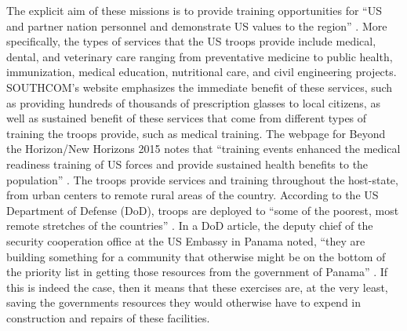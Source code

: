 \documentclass[12pt]{article}
\begin{document}
\begin{doublespace}
The explicit aim of these missions is to provide training opportunities for ``US and partner nation personnel and demonstrate US values to the region'' \cite{SouthcomStatePartner}. More specifically, the types of services that the US troops provide include medical, dental, and veterinary care ranging from preventative medicine to public health, immunization, medical education, nutritional care, and civil engineering projects. SOUTHCOM's website emphasizes the immediate benefit of these services, such as providing hundreds of thousands of prescription glasses to local citizens, as well as sustained benefit of these services that come from different types of training the troops provide, such as medical training. The webpage for Beyond the Horizon/New Horizons 2015 notes that ``training events enhanced the medical readiness training of US forces and provide sustained health benefits to the population'' \cite{southcom2015}. The troops provide services and training throughout the host-state, from urban centers to remote rural areas of the country. According to the US Department of Defense (DoD), troops are deployed to ``some of the poorest, most remote stretches of the countries'' \cite{Miles2013}. In a DoD article, the deputy chief of the security cooperation office at the US Embassy in Panama noted, ``they are building something for a community that otherwise might be on the bottom of the priority list in getting those resources from the government of Panama'' \cite{Miles2013}. If this is indeed the case, then it means that these exercises are, at the very least, saving the governments resources they would otherwise have to expend in construction and repairs of these facilities. 



\end{doublespace}
\end{document}

